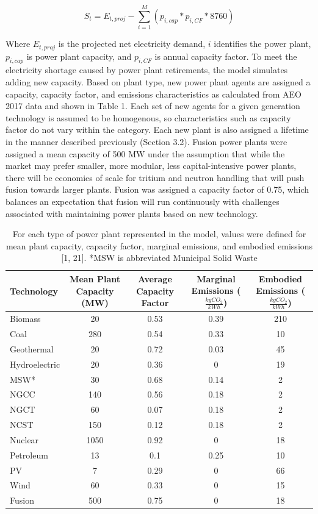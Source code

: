 \documentclass[preprint, 12pt]{elsarticle}
\begin{document}
$$S_t=E_{t,proj}- \sum_{i=1}^M(p_{i,cap}*p_{i,CF}*8760)$$ 

Where $E_{t,proj}$ is the projected net electricity demand, $i$ identifies the power plant, $p_{i,cap}$ is power plant capacity, and $p_{i,CF}$ is annual capacity factor. To meet the electricity shortage caused by power plant retirements, the model simulates adding new capacity. Based on plant type, new power plant agents are assigned a capacity, capacity factor, and emissions characteristics as calculated from AEO 2017 data and shown in Table 1. Each set of new agents for a given generation technology is assumed to be homogenous, so characteristics such as capacity factor do not vary within the category. Each new plant is also assigned a lifetime in the manner described previously (Section 3.2). Fusion power plants were assigned a mean capacity of 500 MW under the assumption that while the market may prefer smaller, more modular, less capital-intensive power plants, there will be economies of scale for tritium and neutron handling that will push fusion towards larger plants. Fusion was assigned a capacity factor of 0.75, which balances an expectation that fusion will run continuously with challenges associated with maintaining power plants based on new technology.

\begin{table}
\begin{center}
\begin{tabulary}{.8\linewidth}{|p{2.5cm}|C|C|C|C|}\hline
Technology & Mean Plant Capacity (MW) & Average Capacity Factor & Marginal Emissions ($\frac{kg CO_2}{kWh}$) & Embodied Emissions ($\frac{kg CO_2}{kWh}$) \\\hline
Biomass &20 & 0.53 & 0.39 & 210 \\ 
Coal & 280 & 0.54 & 0.33 & 10\\
Geothermal & 20 & 0.72 & 0.03 & 45\\
Hydroelectric & 20 & 0.36& 0 & 19 \\
MSW* & 30& 0.68 & 0.14 & 2 \\
NGCC & 140 & 0.56 & 0.18 & 2 \\
NGCT & 60 & 0.07 & 0.18 & 2 \\
NCST & 150 & 0.12 & 0.18 & 2 \\
Nuclear & 1050 & 0.92 & 0 &  18\\
Petroleum & 13 & 0.1 & 0.25 & 10\\
PV & 7 & 0.29 & 0 & 66\\
Wind &  60 & 0.33 & 0 & 15 \\
Fusion & 500 & 0.75 & 0 & 18\\\hline
\end{tabulary}
\end{center}
\caption{For each type of power plant represented in the model, values were defined for mean plant capacity, capacity factor, marginal emissions, and embodied emissions [1, 21].  *MSW is abbreviated Municipal Solid Waste}
\end{table}
\end{document}
